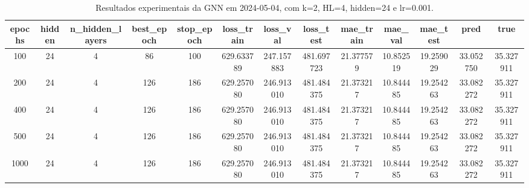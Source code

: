 \begin{table}[h]
\centering
\caption{Resultados experimentais da GNN em 2024-05-04, com k=2, HL=4, hidden=24 e lr=0.001.}
\label{tab:gnn_results_k2_hl4_h24_d20240504}
\begin{tabular}{ccccccccccccc}
\toprule
epochs & hidden & n\_hidden\_layers & best\_epoch & stop\_epoch & loss\_train & loss\_val & loss\_test & mae\_train & mae\_val & mae\_test & pred & true \\
\midrule
100 & 24 & 4 & 86 & 100 & 629.633789 & 247.157883 & 481.697723 & 21.377579 & 10.852519 & 19.259029 & 33.052750 & 35.327911 \\
200 & 24 & 4 & 126 & 186 & 629.257080 & 246.913010 & 481.484375 & 21.373217 & 10.844485 & 19.254263 & 33.082272 & 35.327911 \\
400 & 24 & 4 & 126 & 186 & 629.257080 & 246.913010 & 481.484375 & 21.373217 & 10.844485 & 19.254263 & 33.082272 & 35.327911 \\
500 & 24 & 4 & 126 & 186 & 629.257080 & 246.913010 & 481.484375 & 21.373217 & 10.844485 & 19.254263 & 33.082272 & 35.327911 \\
1000 & 24 & 4 & 126 & 186 & 629.257080 & 246.913010 & 481.484375 & 21.373217 & 10.844485 & 19.254263 & 33.082272 & 35.327911 \\
\bottomrule
\end{tabular}
\end{table}
